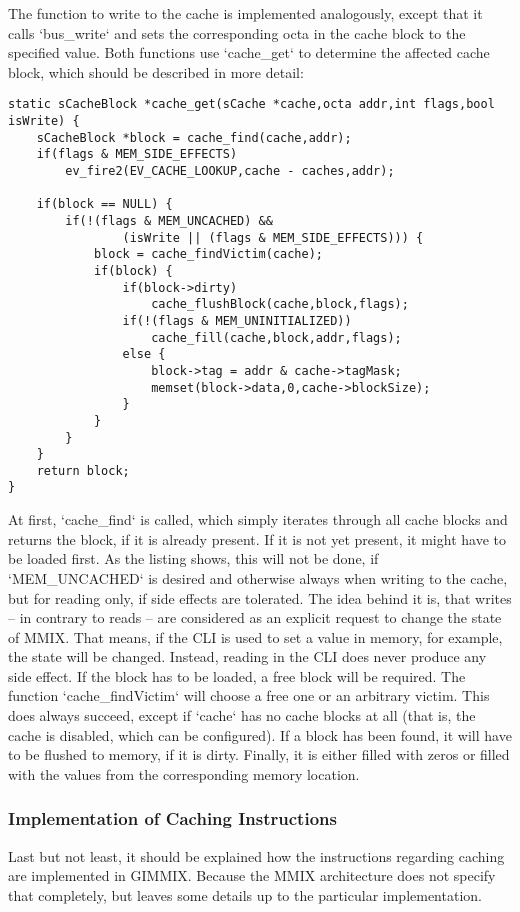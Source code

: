 The function to write to the cache is implemented analogously, except that it calls `bus_write` and sets the corresponding octa in the cache block to the specified value. Both functions use `cache_get` to determine the affected cache block, which should be described in more detail:
\begin{lstlisting}[language=GIMMIXC,caption={Implementation of {\tt cache\_get}}]
static sCacheBlock *cache_get(sCache *cache,octa addr,int flags,bool isWrite) {
	sCacheBlock *block = cache_find(cache,addr);
	if(flags & MEM_SIDE_EFFECTS)
		ev_fire2(EV_CACHE_LOOKUP,cache - caches,addr);

	if(block == NULL) {
		if(!(flags & MEM_UNCACHED) &&
				(isWrite || (flags & MEM_SIDE_EFFECTS))) {
			block = cache_findVictim(cache);
			if(block) {
				if(block->dirty)
					cache_flushBlock(cache,block,flags);
				if(!(flags & MEM_UNINITIALIZED))
					cache_fill(cache,block,addr,flags);
				else {
					block->tag = addr & cache->tagMask;
					memset(block->data,0,cache->blockSize);
				}
			}
		}
	}
	return block;
}
\end{lstlisting}
At first, `cache_find` is called, which simply iterates through all cache blocks and returns the block, if it is already present. If it is not yet present, it might have to be loaded first. As the listing shows, this will not be done, if `MEM_UNCACHED` is desired and otherwise always when writing to the cache, but for reading only, if side effects are tolerated. The idea behind it is, that writes -- in contrary to reads -- are considered as an explicit request to change the state of MMIX. That means, if the CLI is used to set a value in memory, for example, the state will be changed. Instead, reading in the CLI does never produce any side effect. If the block has to be loaded, a free block will be required. The function `cache_findVictim` will choose a free one or an arbitrary victim. This does always succeed, except if `cache` has no cache blocks at all (that is, the cache is disabled, which can be configured). If a block has been found, it will have to be flushed to memory, if it is dirty. Finally, it is either filled with zeros or filled with the values from the corresponding memory location.

\subsubsection{Implementation of Caching Instructions}

Last but not least, it should be explained how the instructions regarding caching are implemented in GIMMIX. Because the MMIX architecture does not specify that completely, but leaves some details up to the particular implementation.

